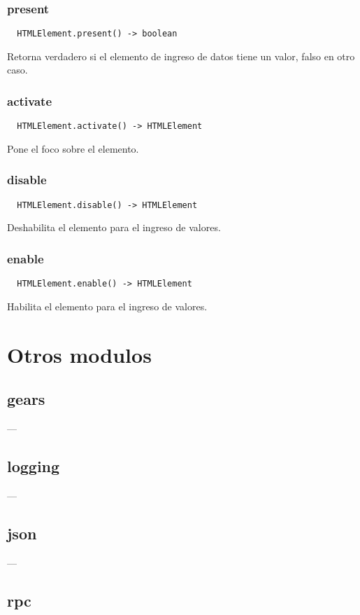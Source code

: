 \subsubsection*{present}
\begin{verbatim}
  HTMLElement.present() -> boolean
\end{verbatim}
Retorna verdadero si el elemento de ingreso de datos tiene un valor, falso en
otro caso.

\subsubsection*{activate}
\begin{verbatim}
  HTMLElement.activate() -> HTMLElement
\end{verbatim}
Pone el foco sobre el elemento.

\subsubsection*{disable}
\begin{verbatim}
  HTMLElement.disable() -> HTMLElement
\end{verbatim}
Deshabilita el elemento para el ingreso de valores.

\subsubsection*{enable}
\begin{verbatim}
  HTMLElement.enable() -> HTMLElement
\end{verbatim}
Habilita el elemento para el ingreso de valores.

\section{Otros modulos}
\subsection{gears}
---
\subsection{logging}
---
\subsection{json}
---
\subsection{rpc}